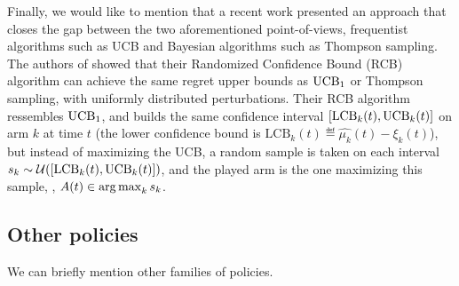 Finally, we would like to mention that a recent work \cite{KimTewari2019} presented an approach that closes the gap between the two aforementioned point-of-views, frequentist algorithms such as UCB and Bayesian algorithms such as Thompson sampling.
The authors of \cite{KimTewari2019} showed that their Randomized Confidence Bound (RCB) algorithm can achieve the same regret upper bounds as $\mathrm{UCB}_1$ or Thompson sampling, with uniformly distributed perturbations.
Their RCB algorithm ressembles $\mathrm{UCB}_1$, and builds the same confidence interval $\left[ \mathrm{LCB}_k(t), \mathrm{UCB}_k(t) \right]$ on arm $k$ at time $t$ (the lower confidence bound is $\mathrm{LCB}_k(t) \eqdef \widehat{\mu_k}(t) - \xi_k(t)$),
but instead of maximizing the UCB, a random sample is taken on each interval $s_k \sim \mathcal{U}(\left[ \mathrm{LCB}_k(t), \mathrm{UCB}_k(t) \right])$, and the played arm is the one maximizing this sample, \ie, $A(t) \in \operatorname*{arg\,max}_k s_k$.


\subsection{Other policies}
\label{sub:2:OtherPolicies}

We can briefly mention other families of policies.




